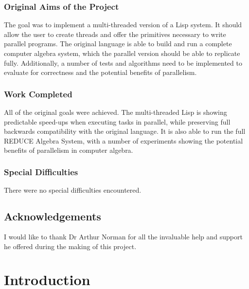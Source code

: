 \documentclass[a4paper,12pt,twoside,openany]{report}
\begin{document}
\subsection*{Original Aims of the Project}

The goal was to implement a multi-threaded version of a Lisp system. It should
allow the user to create threads and offer the primitives necessary to
write parallel programs. The original language is able to build and
run a complete computer algebra system, which the parallel version should
be able to replicate fully. Additionally, a number of tests and algorithms need to
be implemented to evaluate for correctness and the potential benefits of parallelism.

\subsection*{Work Completed}

All of the original goals were achieved. The multi-threaded Lisp
is showing predictable speed-ups when executing tasks in parallel,
while preserving full backwards compatibility with the original language.
It is also able to run the full REDUCE Algebra System, with a number of experiments
showing the potential benefits of parallelism in computer algebra.

\subsection*{Special Difficulties}
There were no special difficulties encountered.

\newpage

\section*{Acknowledgements}
I would like to thank Dr Arthur Norman for all the invaluable help
and support he offered during the making of this project.

\setcounter{tocdepth}{2}
\tableofcontents

\newpage


\pagestyle{headings}

\setcounter{page}{0}

\chapter{Introduction}
\label{ch:introduction}

\end{document}
